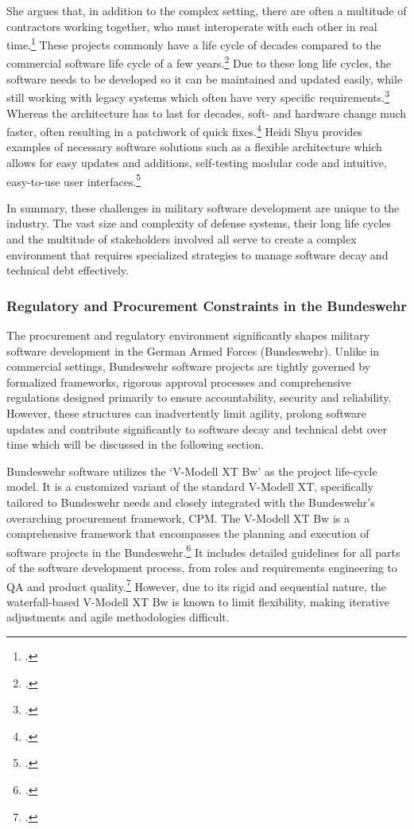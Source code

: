 She argues that, in addition to the complex setting, there are often a multitude of contractors working together, who must interoperate with each other in real time.\footcite[11]{shyu2017military}
These projects commonly have a life cycle of decades compared to the commercial software life cycle of a few years.\footcite[14]{shyu2017military}
Due to these long life cycles, the software needs to be developed so it can be maintained and updated easily, while still working with legacy systems
which often have very specific requirements.\footcite[14]{shyu2017military}
Whereas the architecture has to last for decades, soft- and hardware change much faster, often resulting in a patchwork of quick fixes.\footcite[15]{shyu2017military}
Heidi Shyu provides examples of necessary software solutions such as a flexible architecture which allows for easy updates and additions, self-testing modular code and intuitive, easy-to-use user interfaces.\footcite[17]{shyu2017military}

In summary, these challenges in military software development are unique to the industry. The vast size and complexity of defense systems,
their long life cycles and the multitude of stakeholders involved all serve to create a complex environment that requires specialized strategies to manage software decay and technical debt effectively.

\subsubsection{Regulatory and Procurement Constraints in the Bundeswehr}
The procurement and regulatory environment significantly shapes military software development in the German Armed Forces (Bundeswehr). Unlike in commercial settings,
Bundeswehr software projects are tightly governed by formalized frameworks, rigorous approval processes and comprehensive regulations designed primarily to ensure 
accountability, security and reliability. However, these structures can inadvertently limit agility, prolong software updates and contribute significantly to software decay
and technical debt over time which will be discussed in the following section.

Bundeswehr software utilizes the `V-Modell XT Bw' as the project life-cycle model. It is a customized variant of the standard V-Modell XT, specifically tailored to Bundeswehr needs and closely integrated with the 
Bundeswehr's overarching procurement framework, \ac{CPM}.
The V-Modell XT Bw is a comprehensive framework that encompasses the planning and execution of software projects in the Bundeswehr.\footcite[6]{bundeswehrVModellXTBw2013}
It includes detailed guidelines for all parts of the software development process, from roles and requirements engineering to \ac{QA} and product quality.\footcite[pp. 20-21]{bundeswehrVModellXTBw2013}
However, due to its rigid and sequential nature, the waterfall-based V-Modell XT Bw is known to limit flexibility, making iterative adjustments and agile methodologies difficult.

